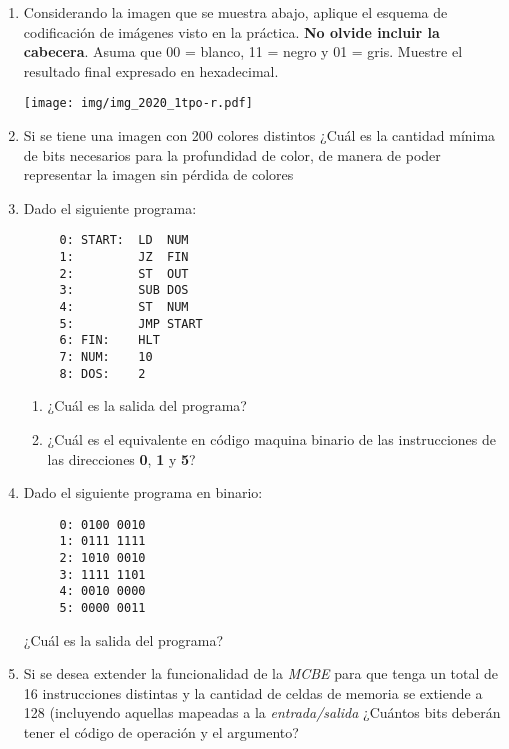 \documentclass[12pt]{article}
\begin{document}
\begin{enumerate}
    \item Considerando la imagen que se muestra abajo, aplique el esquema de
        codificación de imágenes visto en la práctica. \textbf{No olvide
        incluir la cabecera}. Asuma que 00 = blanco, 11 = negro y 01 = gris.
        Muestre el resultado final expresado en hexadecimal.

    \texttt{[image: img/img\_2020\_1tpo-r.pdf]}

    \item Si se tiene una imagen con 200 colores distintos ¿Cuál es la
        cantidad mínima de bits necesarios para la profundidad de color, de
        manera de poder representar la imagen sin pérdida de colores

    \item Dado el siguiente programa:

        \begin{verbatim}
     0: START:  LD  NUM
     1:         JZ  FIN
     2:         ST  OUT
     3:         SUB DOS
     4:         ST  NUM
     5:         JMP START
     6: FIN:    HLT
     7: NUM:    10
     8: DOS:    2
        \end{verbatim}

        \begin{enumerate}

            \item ¿Cuál es la salida del programa?


            \item ¿Cuál es el equivalente en código maquina binario de las
                instrucciones de las direcciones \textbf{0}, \textbf{1} y
                \textbf{5}?

        \end{enumerate}

    \item Dado el siguiente programa en binario:

        \begin{verbatim}
     0: 0100 0010
     1: 0111 1111
     2: 1010 0010
     3: 1111 1101
     4: 0010 0000
     5: 0000 0011
        \end{verbatim}

        ¿Cuál es la salida del programa?

    \item Si se desea extender la funcionalidad de la \emph{MCBE} para que
        tenga un total de 16 instrucciones distintas y la cantidad de celdas
        de memoria se extiende a 128 (incluyendo aquellas mapeadas a la
        \emph{entrada/salida} ¿Cuántos bits deberán tener el código de
        operación y el argumento?


\end{enumerate}
\end{document}
